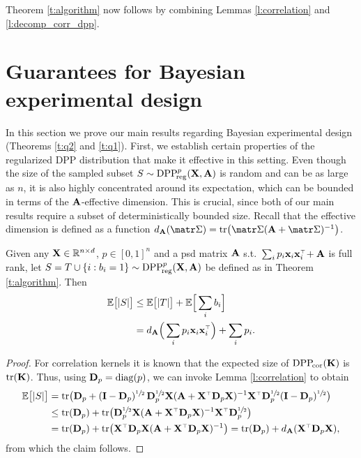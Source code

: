 \documentclass[../../thesis.tex]{subfiles}
\begin{document}
Theorem
\ref{t:algorithm} now follows by combining Lemmas \ref{l:correlation} and \ref{l:decomp_corr_dpp}.

\section{Guarantees for Bayesian experimental design}
\label{s:guarantees}
In this section we prove our main results regarding Bayesian
experimental design (Theorems \ref{t:q2} and \ref{t:q1}). First, we
establish certain properties of the regularized DPP distribution that
make it effective in this setting. Even though the size of the
sampled subset $S\sim{{\mathrm{DPP}}_{\!\mathrm{reg}}^{p}}(\mathbf X,\mathbf A)$ is random and can be as large
as $n$, it is also highly concentrated around its expectation, which
can be bounded in terms of the $\mathbf A$-effective dimension. This is
crucial, since both of our main results require a subset of
deterministically bounded size. Recall that the effective dimension is
defined as a function $d_{\A}(\Sigmab) =
  \tr\big(\Sigmab(\A+\Sigmab)^{-1}\big)$.
\begin{lemma}\label{l:size}
  Given any $\mathbf X\in\mathbb R^{n\times d}$, $p\in[0,1]^n$ and a psd matrix $\mathbf A$
  s.t.~$\sum_ip_i\x_i\x_i^\top\!+\A$ is
  full rank, let $S=T\cup \{i:b_i=1\}\sim {{\mathrm{DPP}}_{\!\mathrm{reg}}^{p}}(\mathbf X,\mathbf A)$ be defined
  as in Theorem \ref{t:algorithm}. Then
  \begin{align*}
    \E\big[|S|\big] & \leq \E\big[|T|\big] + \E\Big[\sum_i b_i\Big]          \\
                    & = d_{\A}\Big(\sum_ip_i\x_i\x_i^\top\Big) + \sum_i p_i.
  \end{align*}
\end{lemma}
\begin{proof}
  For correlation kernels it is known that the expected size of ${{\mathrm{DPP}}_{\!\mathrm{cor}}}(\mathbf K)$
  is $\mathrm{tr}(\mathbf K)$. Thus, using $\mathbf D_p=\operatorname*{\mathop{\mathrm{diag}}}(p)$, we can invoke Lemma \ref{l:correlation} to obtain
  \begin{align*}
    \E\big[|S|\big]
     & = \tr\big(\D_p +
    (\I-\D_p)^{\sfrac12}\,\D_p^{\sfrac12}\X(\A+\X^\top\D_p\X)^{-1}
    \X^\top\D_p^{\sfrac12}(\I-\D_p)^{\sfrac12}\big)
    \\ &\leq \tr(\D_p) +\tr\big(\D_p^{\sfrac12}
    \X(\A+\X^\top\D_p\X)^{-1}\X^\top\D_p^{\sfrac12}\big)
    \\ &=\tr(\D_p) +\tr\big(\X^\top\D_p\X (\A+\X^\top\D_p\X)^{-1}\big) =
    \tr(\D_p) + d_{\A}(\X^\top\D_p\X),
  \end{align*}
  from which the claim follows.
\end{proof}
\end{document}
